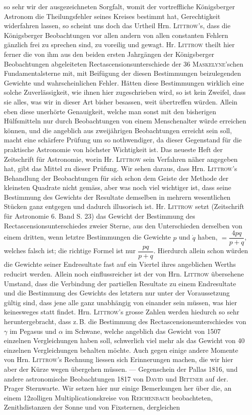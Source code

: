 so sehr wir der ausgezeichneten Sorgfalt, womit der vortreffliche Königsberger Astronom die Theilungsfehler seines Kreises bestimmt hat, Gerechtigkeit widerfahren lassen, so scheint uns doch das Urtheil Hrn. \textsc{Littrow}'s, dass die Königsberger Beobachtungen vor allen andern von allen constanten Fehlern gänzlich frei zu sprechen sind, zu voreilig und gewagt. Hr. \textsc{Littrow} theilt hier ferner die von ihm aus den beiden ersten Jahrgängen der Königsberger Beobachtungen abgeleiteten Rectascensionsunterschiede der 36 \textsc{Maskelyne}'schen Fundamentalsterne mit, mit Beifügung der diesen Bestimmungen beizulegenden Gewichte und wahrscheinlichen Fehler. Hätten diese Bestimmungen wirklich eine solche Zuverlässigkeit, wie ihnen hier zugeschrieben wird, so ist kein Zweifel, dass sie alles, was wir in dieser Art bisher besassen, weit übertreffen würden. Allein eben diese unerhörte Genauigkeit, welche man sonst mit den bisherigen Hülfsmitteln nur durch Beobachtungen von einem Menschenalter würde erreichen können, und die angeblich aus zweijährigen Beobachtungen erreicht sein soll, macht eine schärfere Prüfung um so nothwendiger, da dieser Gegenstand für die praktische Astronomie von höchster Wichtigkeit ist. Das neueste Heft der Zeitschrift für Astronomie, worin Hr. \textsc{Littrow} sein Verfahren näher angegeben hat, gibt das Mittel zu dieser Prüfung. Wir sehen daraus, dass Hrn. \textsc{Littrow}'s Behandlung der Beobachtungen für sich schon dem Geiste der Methode der kleinsten Quadrate nicht gemäss, aber was noch viel wichtiger ist, dass seine Bestimmung des Gewichts der Resultate demselben in mehrern wesentlichen Stücken ganz entgegen und dadurch illusorisch ist. Hr. \textsc{Littrow} setzt (Zeitschrift für Astronomie 6. Band S. 23) das Gewicht der Bestimmung des Rectascensionsunterschiedes zweier Sterne, aus den Unterschieden derselben von einem dritten, wenn letztre Bestimmungen die Gewichte $p$ und $\dot{q}$ haben, $=\dfrac{4pq}{p+q}$, welches falsch ist; die richtige Formel ist nur $\dfrac{pq}{p+q}$. Hierdurch allein schon würden die Gewichte seiner Endresultate fast auf ein Viertel ihres angeblichen Werths reducirt werden. Allein noch einflussreicher ist der von Hrn. \textsc{Littrow} übersehene Umstand, dass die Verbindung der partiellen Resultate zu einem Endresultate und die Bestimmung des Gewichts des letztern nur unter der Voraussetzung gültig sind, dass jene alle ganz unabhängig von einander sein müssen, was hier keinesweges statt findet. Hrn. \textsc{Littrow}'s grosse Zahlen werden hiedurch so sehr heruntergebracht, dass z.\,B. die Bestimmung des Rectascensionsunterschiedes von $\gamma$ im Pegasus und $\alpha$ im Schwane, welche angeblich das Gewicht von 1507 einzelnen Vergleichungen haben soll, schwerlich viel mehr als das Gewicht von 40 einzelnen Vergleichungen behalten möchte. Auch gegen einige andere Momente von Hrn. \textsc{Littrow}'s Rechnung liessen sich Erinnerungen machen, die wir hier aber der Kürze wegen übergehen müssen. --- Gegenschein der Pallas 1816, und andere astronomische Beobachtungen 1817 von \textsc{David} und \textsc{Bittner} auf der. Prager Sternwarte. Wir setzen hier nur einige Bemerkungen her über die, an einem 12zolligen Multiplicationskreise von \textsc{Reichenbach} beobachteten, Zenithdistanzen der Sonne und von Fixsternen, dergleichen 